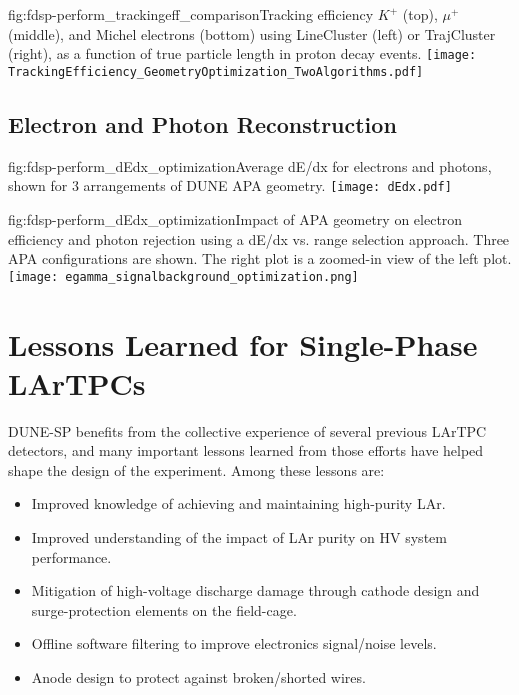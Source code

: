 \begin{dunefigure}{fig:fdsp-perform_trackingeff_comparison}{Tracking efficiency $K^+$ (top), $\mu^+$ (middle), and Michel electrons (bottom) using LineCluster (left) or TrajCluster (right), as a function of true particle length in proton decay events.}
\texttt{[image: TrackingEfficiency\_GeometryOptimization\_TwoAlgorithms.pdf]}
\end{dunefigure}

\subsection{Electron and Photon Reconstruction}
\label{sec:fdsp-perform-showerreco}

\begin{dunefigure}{fig:fdsp-perform_dEdx_optimization}{Average dE/dx for electrons and photons, shown for 3 arrangements of DUNE APA  geometry.}
\texttt{[image: dEdx.pdf]}
\end{dunefigure}

\begin{dunefigure}{fig:fdsp-perform_dEdx_optimization}{Impact of APA geometry on electron efficiency and photon rejection using a dE/dx vs. range selection approach.  Three APA configurations are shown.  The right plot is a zoomed-in view of the left plot.}
\texttt{[image: egamma\_signalbackground\_optimization.png]}
\end{dunefigure}


\section{Lessons Learned for Single-Phase LArTPCs}
\label{sec:fdsp-perform-lessons}

DUNE-SP benefits from the collective experience of several previous LArTPC detectors, and many important lessons learned from those efforts have helped shape the design of the experiment.  Among these lessons are:

\begin{itemize}
\item{Improved knowledge of achieving and maintaining high-purity LAr.}
\item{Improved understanding of the impact of LAr purity on HV system performance.}
\item{Mitigation of high-voltage discharge damage through cathode design and surge-protection elements on the field-cage.}
\item{Offline software filtering to improve electronics signal/noise levels.}
\item{Anode design to protect against broken/shorted wires.}
\end{itemize}

